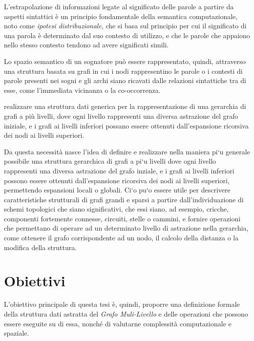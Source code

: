 L'estrapolazione di informazioni legate al significato delle parole a partire da aspetti sintattici \`e un
principio fondamentale della semantica computazionale, noto come \textit{ipotesi distribuzionale}, che si basa sul
principio per cui il significato di una parola \`e determinato dal suo contesto di utilizzo, e che le parole che
appaiono nello stesso contesto tendono ad avere significati simili.\newline

Lo spazio semantico di un sognatore pu\`o essere rappresentato, quindi, attraverso una struttura basata su grafi in cui
i nodi rappresentino le parole o i contesti di parole presenti nei sogni e gli archi siano ricavati dalle relazioni
sintattiche tra di esse, come l'immediata vicinanza o la co-occorrenza. \newline

 realizzare una struttura dati generica per la rappresentazione di una
gerarchia di grafi a pi\`u livelli, dove ogni livello rappresenti una diversa astrazione del grafo iniziale, e i
grafi ai livelli inferiori possano essere ottenuti dall'espansione ricorsiva dei nodi ai livelli superiori. \newline

Da questa necessit\`a nasce l'idea di definire e realizzare nella maniera pi`u generale possibile una struttura
gerarchica di grafi a pi`u livelli dove ogni livello rappresenti una diversa astrazione del grafo inziale,
e i grafi ai livelli inferiori possono essere ottenuti dall’espansione ricorsiva dei nodi ai livelli superiori,
permettendo espansioni locali o globali.
Ci`o pu`o essere utile per descrivere caratteristiche strutturali di grafi grandi e sparsi a partire
dall’individuazione di schemi topologici che siano significativi, che essi siano, ad esempio, cricche, componenti
fortemente connesse, circuiti, stelle o cammini, e fornire operazioni che permettano di operare ad un determinato
livello di astrazione nella gerarchia, come ottenere il grafo corrispondente ad un nodo, il calcolo della distanza
o la modifica della struttura.

\section{Obiettivi}
L'obiettivo principale di questa tesi \`e, quindi, proporre una definizione formale della struttura dati astratta del
\textit{Grafo Muli-Livello} e delle operazioni che possono essere eseguite su di essa, nonch\'e di valutarne
complessit\`a computazionale e spaziale. \newline

